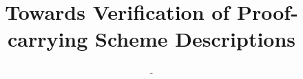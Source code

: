 \documentclass[letterpaper,fullpage,10pt]{article}
\begin{document}
\date{}

\title{Towards Verification of Proof-carrying Scheme Descriptions}

\author{-}

\maketitle

\begin{abstract}

\end{abstract}













\end{document}
